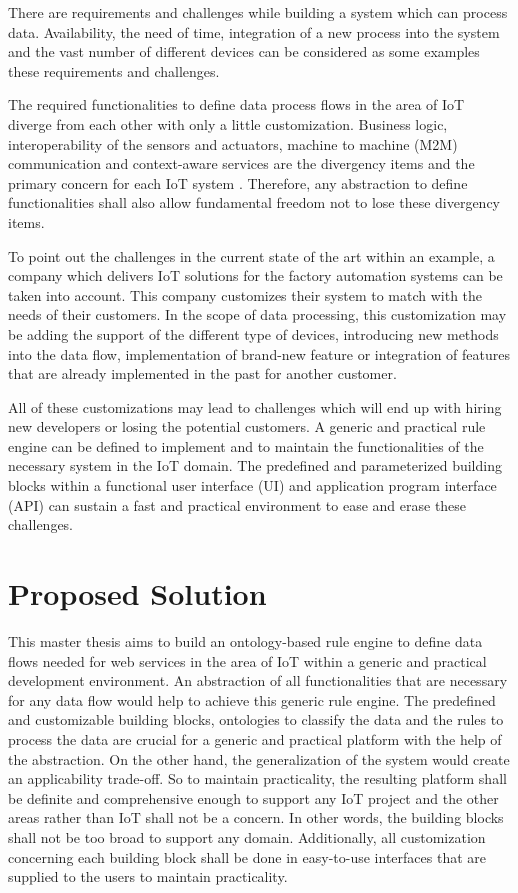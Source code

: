 There are requirements and challenges while building a system which can process data. Availability, the need of time, integration of a new process into the system and the vast number of different devices can be considered as some examples these requirements and challenges.

The required functionalities to define data process flows in the area of IoT diverge from each other with only a little customization. Business logic, interoperability of the sensors and actuators, machine to machine (M2M) communication and context-aware services are the divergency items and the primary concern for each IoT system \cite{6651222}. Therefore, any abstraction to define functionalities shall also allow fundamental freedom not to lose these divergency items.

To point out the challenges in the current state of the art within an example, a company which delivers IoT solutions for the factory automation systems can be taken into account. This company customizes their system to match with the needs of their customers. In the scope of data processing, this customization may be adding the support of the different type of devices, introducing new methods into the data flow, implementation of brand-new feature or integration of features that are already implemented in the past for another customer.

All of these customizations may lead to challenges which will end up with hiring new developers or losing the potential customers. A generic and practical rule engine can be defined to implement and to maintain the functionalities of the necessary system in the IoT domain. The predefined and parameterized building blocks within a functional user interface (UI) and application program interface (API) can sustain a fast and practical environment to ease and erase these challenges.

\section{Proposed Solution}

This master thesis aims to build an ontology-based rule engine to define data flows needed for web services in the area of IoT within a generic and practical development environment. An abstraction of all functionalities that are necessary for any data flow would help to achieve this generic rule engine. The predefined and customizable building blocks, ontologies to classify the data and the rules to process the data are crucial for a generic and practical platform with the help of the abstraction. On the other hand, the generalization of the system would create an applicability trade-off. So to maintain practicality, the resulting platform shall be definite and comprehensive enough to support any IoT project and the other areas rather than IoT shall not be a concern. In other words, the building blocks shall not be too broad to support any domain. Additionally, all customization concerning each building block shall be done in easy-to-use interfaces that are supplied to the users to maintain practicality. 

